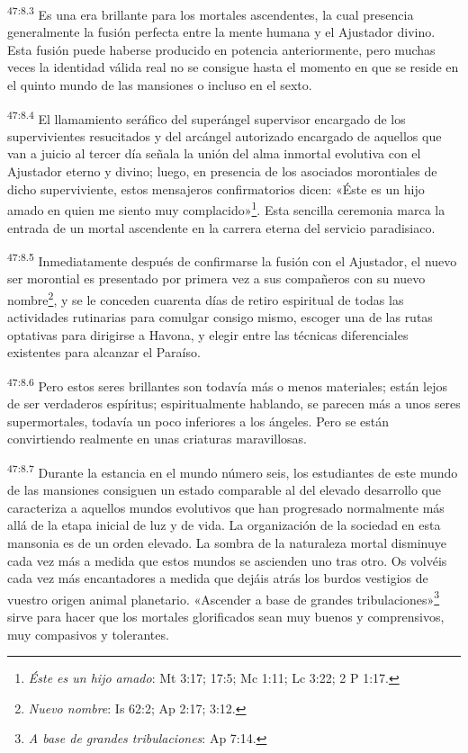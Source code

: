 \par
\textsuperscript{47:8.3} Es una era brillante para los mortales ascendentes, la cual presencia generalmente la fusión perfecta entre la mente humana y el Ajustador divino. Esta fusión puede haberse producido en potencia anteriormente, pero muchas veces la identidad válida real no se consigue hasta el momento en que se reside en el quinto mundo de las mansiones o incluso en el sexto.

\par
\textsuperscript{47:8.4} El llamamiento seráfico del superángel supervisor encargado de los supervivientes resucitados y del arcángel autorizado encargado de aquellos que van a juicio al tercer día señala la unión del alma inmortal evolutiva con el Ajustador eterno y divino; luego, en presencia de los asociados morontiales de dicho superviviente, estos mensajeros confirmatorios dicen: «Éste es un hijo amado en quien me siento muy complacido»\footnote{\textit{Éste es un hijo amado}: Mt 3:17; 17:5; Mc 1:11; Lc 3:22; 2 P 1:17.}. Esta sencilla ceremonia marca la entrada de un mortal ascendente en la carrera eterna del servicio paradisiaco.

\par
\textsuperscript{47:8.5} Inmediatamente después de confirmarse la fusión con el Ajustador, el nuevo ser morontial es presentado por primera vez a sus compañeros con su nuevo nombre\footnote{\textit{Nuevo nombre}: Is 62:2; Ap 2:17; 3:12.}, y se le conceden cuarenta días de retiro espiritual de todas las actividades rutinarias para comulgar consigo mismo, escoger una de las rutas optativas para dirigirse a Havona, y elegir entre las técnicas diferenciales existentes para alcanzar el Paraíso.

\par
\textsuperscript{47:8.6} Pero estos seres brillantes son todavía más o menos materiales; están lejos de ser verdaderos espíritus; espiritualmente hablando, se parecen más a unos seres supermortales, todavía un poco inferiores a los ángeles. Pero se están convirtiendo realmente en unas criaturas maravillosas.

\par
\textsuperscript{47:8.7} Durante la estancia en el mundo número seis, los estudiantes de este mundo de las mansiones consiguen un estado comparable al del elevado desarrollo que caracteriza a aquellos mundos evolutivos que han progresado normalmente más allá de la etapa inicial de luz y de vida. La organización de la sociedad en esta mansonia es de un orden elevado. La sombra de la naturaleza mortal disminuye cada vez más a medida que estos mundos se ascienden uno tras otro. Os volvéis cada vez más encantadores a medida que dejáis atrás los burdos vestigios de vuestro origen animal planetario. «Ascender a base de grandes tribulaciones»\footnote{\textit{A base de grandes tribulaciones}: Ap 7:14.} sirve para hacer que los mortales glorificados sean muy buenos y comprensivos, muy compasivos y tolerantes.

